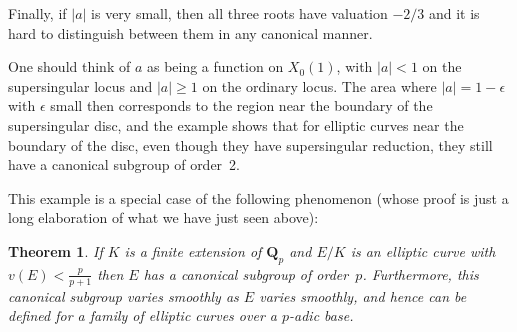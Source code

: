 \documentclass{article}
\newcommand{\Q}{\mathbf{Q}}
\newtheorem*{theoremn}{Theorem}
\begin{document}
Finally, if $|a|$ is very small, then all three roots have valuation
$-2/3$ and it is hard to distinguish between them in any canonical
manner.

One should think of $a$ as being a function on $X_0(1)$, with $|a|<1$
on the supersingular locus and $|a|\geq1$ on the ordinary locus. 
The area where $|a|=1-\epsilon$ with $\epsilon$ small then corresponds
to the region near the boundary of the supersingular disc, and the
example shows that for elliptic curves near the boundary of the disc,
even though they have supersingular reduction, they still have
a canonical subgroup of order~2.

This example is a special case of the following phenomenon (whose proof
is just a long elaboration of what we have just seen above):

\begin{theoremn} If $K$ is a finite extension of $\Q_p$ and $E/K$
is an elliptic curve with $v(E)<\frac{p}{p+1}$ then $E$ has a canonical
subgroup of order~$p$. Furthermore, this canonical subgroup varies
smoothly as $E$ varies smoothly, and hence can be defined for a family
of elliptic curves over a $p$-adic base.

\end{theoremn}
\end{document}
